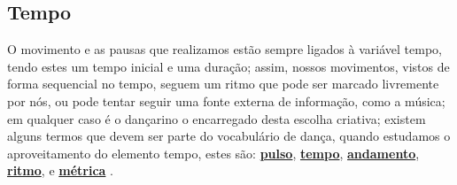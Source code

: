 \subsection{Tempo}
O movimento e as pausas que realizamos estão sempre ligados à variável tempo,
tendo estes um tempo inicial e uma duração;
assim, nossos movimentos, vistos de forma sequencial no tempo, 
seguem um ritmo que pode ser marcado livremente por nós,
ou pode tentar seguir uma fonte externa de informação, como a música;
em qualquer caso é o dançarino o encarregado desta escolha criativa;
existem alguns termos que devem ser parte do vocabulário de dança,
quando estudamos o aproveitamento do elemento tempo,
estes são: 
\hyperref[ref:Pulso]{\textbf{pulso}}, 
\hyperref[sec:Tempo]{\textbf{tempo}}, 
\hyperref[sec:Andamento]{\textbf{andamento}}, 
\hyperref[sec:pos:Ritmo]{\textbf{ritmo}}, e 
\hyperref[def:Metrica]{\textbf{métrica}}
\cite[pp. 82]{schrader2005sense}
\cite[pp. 131, 134, 136]{mccutchen2006teaching}.


